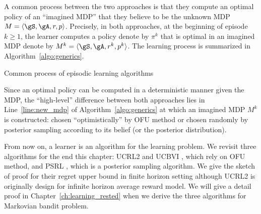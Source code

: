 A common process between the two approaches is that they compute an optimal policy of an ``imagined MDP'' that they believe to be the unknown MDP $M=\langle\gS,\gA,r,p\rangle$.
Precisely, in both approaches, at the beginning of episode $k\ge1$, the learner computes a policy denote by $\pi^k$ that is optimal in an imagined MDP denote by $M^k=\langle\gS,\gA,r^k,p^k\rangle$.
The learning process is summarized in Algorithm~\ref{algo:generics}.

\begin{algorithm}[ht]
    \DontPrintSemicolon
    \BlankLine
    \caption{Common process of episodic learning algorithms}
    \label{algo:generics}
\end{algorithm}

Since an optimal policy can be computed in a deterministic manner given the MDP, the ``high-level'' difference between both approaches lies in Line~\ref{line:new_mdp} of Algorithm~\ref{algo:generics} at which an imagined MDP $M^k$ is constructed: chosen ``optimistically'' by OFU method or chosen randomly by posterior sampling according to its belief (or the posterior distribution).

From now on, a learner is an algorithm for the learning problem.
We revisit three algorithms for the end this chapter: UCRL2 \cite{jaksch2010near} and UCBVI \cite{azar2017minimax}, which rely on OFU method, and PSRL \cite{osband2013more}, which is a posterior sampling algorithm.
We give the sketch of proof for their regret upper bound in finite horizon setting although UCRL2 is originally design for infinite horizon average reward model.
We will give a detail proof in Chapter~\ref{ch:learning_rested} when we derive the three algorithms for Markovian bandit problem.

